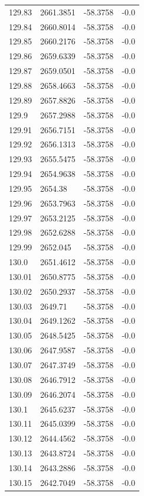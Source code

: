 \begin{table}[H]
\begin{tabular}{llll}
129.83 & 2661.3851 & -58.3758 & -0.0 \\
129.84 & 2660.8014 & -58.3758 & -0.0 \\
129.85 & 2660.2176 & -58.3758 & -0.0 \\
129.86 & 2659.6339 & -58.3758 & -0.0 \\
129.87 & 2659.0501 & -58.3758 & -0.0 \\
129.88 & 2658.4663 & -58.3758 & -0.0 \\
129.89 & 2657.8826 & -58.3758 & -0.0 \\
129.9 & 2657.2988 & -58.3758 & -0.0 \\
129.91 & 2656.7151 & -58.3758 & -0.0 \\
129.92 & 2656.1313 & -58.3758 & -0.0 \\
129.93 & 2655.5475 & -58.3758 & -0.0 \\
129.94 & 2654.9638 & -58.3758 & -0.0 \\
129.95 & 2654.38 & -58.3758 & -0.0 \\
129.96 & 2653.7963 & -58.3758 & -0.0 \\
129.97 & 2653.2125 & -58.3758 & -0.0 \\
129.98 & 2652.6288 & -58.3758 & -0.0 \\
129.99 & 2652.045 & -58.3758 & -0.0 \\
130.0 & 2651.4612 & -58.3758 & -0.0 \\
130.01 & 2650.8775 & -58.3758 & -0.0 \\
130.02 & 2650.2937 & -58.3758 & -0.0 \\
130.03 & 2649.71 & -58.3758 & -0.0 \\
130.04 & 2649.1262 & -58.3758 & -0.0 \\
130.05 & 2648.5425 & -58.3758 & -0.0 \\
130.06 & 2647.9587 & -58.3758 & -0.0 \\
130.07 & 2647.3749 & -58.3758 & -0.0 \\
130.08 & 2646.7912 & -58.3758 & -0.0 \\
130.09 & 2646.2074 & -58.3758 & -0.0 \\
130.1 & 2645.6237 & -58.3758 & -0.0 \\
130.11 & 2645.0399 & -58.3758 & -0.0 \\
130.12 & 2644.4562 & -58.3758 & -0.0 \\
130.13 & 2643.8724 & -58.3758 & -0.0 \\
130.14 & 2643.2886 & -58.3758 & -0.0 \\
130.15 & 2642.7049 & -58.3758 & -0.0 \\

\end{tabular}
\end{table}
